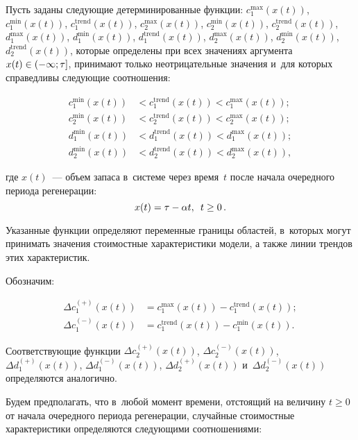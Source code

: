\begin{multicols}{2}
Пусть заданы следующие детерминированные функции: $c_1^{\max}(x(t))$, 
$c_1^{\min}(x(t))$, $c_1^{\mathrm{trend}}(x(t))$, $c_2^{\max}(x(t))$, $c_2^{\min}(x(t))$, 
$c_2^{\mathrm{trend}}(x(t))$, $d_1^{\max}(x(t))$, $d_1^{\min}(x(t))$, $d_1^{\mathrm{trend}}(x(t))$, 
$d_2^{\max}(x(t))$, $d_2^{\min}(x(t))$, $d_2^{\mathrm{trend}}(x(t))$, которые определены 
при всех значениях аргумента $x(t)\hm\in\left(-\infty;\tau\right]$, принимают 
только неотрицательные значения и~для которых справедливы следующие соотношения:

\noindent
\begin{align*}
c_1^{\min}(x(t))&<c_1^{\mathrm{trend}}(x(t))<c_1^{\max}(x(t));\\
c_2^{\min}(x(t))&<c_2^{\mathrm{trend}}(x(t))<c_2^{\max}(x(t));\\
d_1^{\min}(x(t))&<d_1^{\mathrm{trend}}(x(t))<d_1^{\max}(x(t));\\
d_2^{\min}(x(t))&<d_2^{\mathrm{trend}}(x(t))<d_2^{\max}(x(t)),
\end{align*}

\vspace*{-3pt}

\noindent
где $x(t)$~--- объем запаса в~системе через время~$t$ после начала очередного 
периода регенерации: 
$$
x(t)=\tau\hm-\alpha t,\enskip t\hm\geq 0\,.
$$

\vspace*{-6pt}

Указанные функции определяют переменные границы областей, в~которых могут 
принимать значения стоимостные характеристики модели, а также линии трендов этих 
характеристик.

Обозначим:

\noindent
\begin{align*}
\Delta c_1^{(+)}(x(t))&=c_1^{\max}(x(t))-c_1^{\mathrm{trend}}(x(t));\\
\Delta c_1^{(-)}(x(t))&=c_1^{\mathrm{trend}}(x(t))-c_1^{\min}(x(t)).
\end{align*}

\vspace*{-6pt}

Соответствующие функции $\Delta c_2^{(+)}(x(t))$, $\Delta c_2^{(-)}(x(t))$, 
$\Delta d_1^{(+)}(x(t))$, $\Delta d_1^{(-)}(x(t))$, $\Delta d_2^{(+)}(x(t))$ 
и~$\Delta d_2^{(-)}(x(t))$ определяются аналогично.

Будем предполагать, что в~любой момент времени, отстоящий на величину $t\geq0$ 
от начала очередного периода регенерации, случайные стоимостные характеристики 
определяются следующими соотношениями:


\end{multicols}

